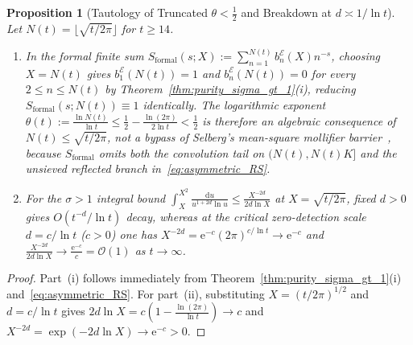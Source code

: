 \documentclass[11pt,reqno]{amsart}
\newtheorem{proposition}[theorem]{Proposition}
\theoremstyle{definition}
\theoremstyle{remark}
\numberwithin{equation}{section}
\newcommand{\dd}{\mathrm{d}}
\newcommand{\ee}{\mathrm{e}}
\begin{document}
\begin{proposition}[Tautology of Truncated $\theta < \frac{1}{2}$ and Breakdown at $d \asymp 1/\ln t$]\label{prop:sub_selberg_tautology}
Let $N(t) = \lfloor\sqrt{t/2\pi}\rfloor$ for $t \ge 14$.
\begin{enumerate}[label=\textup{(\roman*)},leftmargin=2.2em]
\item In the formal finite sum $S_{\mathrm{formal}}(s; X) := \sum_{n=1}^{N(t)} b_n^{\mathcal{E}}(X)n^{-s}$, choosing $X = N(t)$ gives $b_1^{\mathcal{E}}(N(t)) = 1$ and $b_n^{\mathcal{E}}(N(t)) = 0$ for every $2 \le n \le N(t)$ by Theorem~\ref{thm:purity_sigma_gt_1}(i), reducing $S_{\mathrm{formal}}(s; N(t)) \equiv 1$ identically. The logarithmic exponent $\theta(t) := \frac{\ln N(t)}{\ln t} \le \frac{1}{2} - \frac{\ln(2\pi)}{2\ln t} < \frac{1}{2}$ is therefore an algebraic consequence of $N(t) \le \sqrt{t/2\pi}$, not a bypass of Selberg's mean-square mollifier barrier~\cite{selberg1942}, because $S_{\mathrm{formal}}$ omits both the convolution tail on $(N(t), N(t)K]$ and the unsieved reflected branch in~\eqref{eq:asymmetric_RS}.
\item For the $\sigma > 1$ integral bound $\int_X^{X^2} \frac{\dd u}{u^{1+2d}\ln u} \le \frac{X^{-2d}}{2d\ln X}$ at $X = \sqrt{t/2\pi}$, fixed $d > 0$ gives $O(t^{-d}/\ln t)$ decay, whereas at the critical zero-detection scale $d = c/\ln t$ ($c > 0$) one has $X^{-2d} = \ee^{-c}(2\pi)^{c/\ln t} \to \ee^{-c}$ and $\frac{X^{-2d}}{2d\ln X} \to \frac{\ee^{-c}}{c} = \mathcal{O}(1)$ as $t \to \infty$.
\end{enumerate}
\end{proposition}

\begin{proof}
Part~(i) follows immediately from Theorem~\ref{thm:purity_sigma_gt_1}(i) and~\eqref{eq:asymmetric_RS}. For part~(ii), substituting $X = (t/2\pi)^{1/2}$ and $d = c/\ln t$ gives $2d\ln X = c(1 - \frac{\ln(2\pi)}{\ln t}) \to c$ and $X^{-2d} = \exp(-2d\ln X) \to \ee^{-c} > 0$.
\end{proof}
\end{document}
